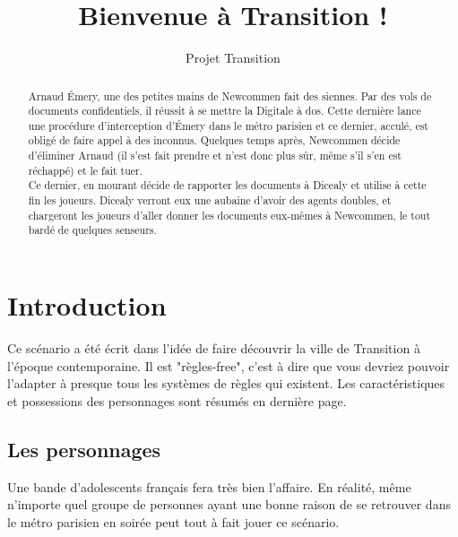 \documentclass[10pt,a4paper,twocolumn]{article}
\author{Projet Transition}
\title{Bienvenue à Transition !}
\begin{document}
\maketitle
\begin{abstract}
Arnaud Émery, une des petites mains de Newcommen fait des siennes. Par des vols de documents confidentiels, il réussit à se mettre la Digitale à dos. Cette dernière lance une procédure d'interception d'Émery dans le métro parisien et ce dernier, acculé, est obligé de faire appel à des inconnus. 
Quelques temps après, Newcommen décide d'éliminer Arnaud (il s'est fait prendre et n'est donc plus sûr, même s'il s'en est réchappé) et le fait tuer.\\
Ce dernier, en mourant décide de rapporter les documents à Dicealy et utilise à cette fin les joueurs. Dicealy verront eux une aubaine d'avoir des agents doubles, et chargeront les joueurs d'aller donner les documents eux-mêmes à Newcommen, le tout bardé de quelques senseurs.
\end{abstract}
\section{Introduction}
Ce scénario a été écrit dans l'idée de faire découvrir la ville de Transition à l'époque contemporaine. Il est "règles-free", c'est à dire que vous devriez pouvoir l'adapter à presque tous les systèmes de règles qui existent. Les caractéristiques et possessions des personnages sont résumés en dernière page.

\subsection*{Les personnages}
Une bande d'adolescents français fera très bien l'affaire. En réalité, même n'importe quel groupe de personnes ayant une bonne raison de se retrouver dans le métro parisien en soirée peut tout à fait jouer ce scénario.
\end{document}
